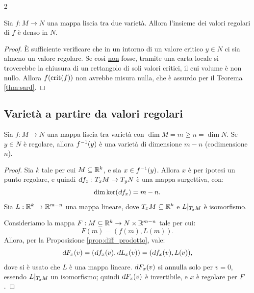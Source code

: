 \begin{multicols*}{2}
    \begin{corollary}[di Brown] \label{cor:brown} Sia $f : M \to N$ una
        mappa liscia tra due varietà. Allora l'insieme dei valori
        regolari di $f$ è denso in $N$.
    \end{corollary}

    \begin{proof}
        È sufficiente verificare che in un intorno di un valore critico $y \in N$ ci
        sia almeno un valore regolare. Se così \underline{non} fosse, tramite una carta
        locale si troverebbe la chiusura di un rettangolo di soli valori critici, il
        cui volume è non nullo. Allora $f(\operatorname{crit}(f))$ non avrebbe misura nulla, che
        è assurdo per il Teorema \ref{thm:sard}.
    \end{proof}

    \subsection{Varietà a partire da valori regolari}

    \begin{theorem} \label{thm:varietà_da_valore_regolare}
        Sia $f : M \to N$ una mappa liscia tra varietà con $\dim M = m \geq n = \dim N$. Se
        $y \in N$ è regolare, allora $f^{-1}(y)$ è una varietà di dimensione $m - n$
        \textnormal{(codimensione $n$)}.
    \end{theorem}

    \begin{proof}
        Sia $k$ tale per cui $M \subseteq \mathbb{R}^k$, e sia $x \in f^{-1}(y)$.
        Allora $x$ è per ipotesi un punto regolare, e quindi
        $\dif f_x : T_x M \to T_y N$ è una mappa surgettiva, con:
        \[
            \dim \ker(\dif f_x) = m - n.
        \]
        Sia $L : \mathbb{R}^k \to \mathbb{R}^{m-n}$ una mappa lineare, dove $T_x M \subseteq \mathbb{R}^k$
        e $L\arrowvert_{T_x M}$ è isomorfismo. \smallskip

        Consideriamo la mappa $F : M \subseteq \mathbb{R}^k \to N \times \mathbb{R}^{m-n}$ tale per cui:
        \[
            F(m) = (f(m), L(m)).
        \]
        Allora, per la Proposizione \ref{prop:diff_prodotto}, vale:
        \[
            \dif F_x(v) = (\dif f_x(v), \dif L_x(v)) = (\dif f_x(v), L(v)),
        \]
        dove si è usato che $L$ è una mappa lineare. $\dif F_x(v)$ si annulla solo
        per $v = 0$, essendo $L\arrowvert_{T_x M}$ un isomorfismo; quindi
        $\dif F_x(v)$ è invertibile, e $x$ è regolare per $F$. \smallskip


\end{proof}
\end{multicols*}
